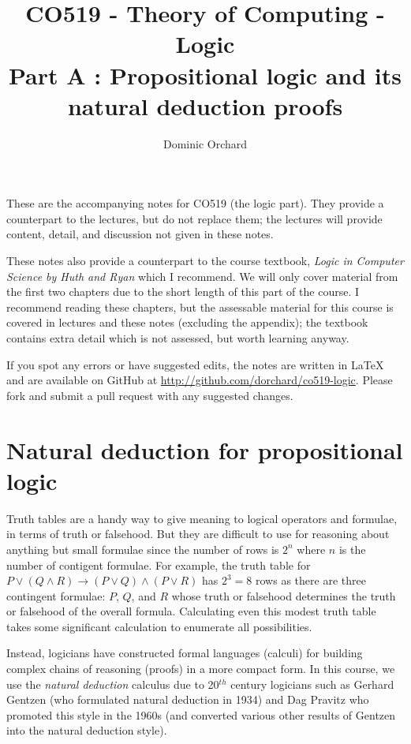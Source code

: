 \documentclass{article}
\title{\vspace{-3em}CO519 - Theory of Computing - Logic \\
  {\large{Part A : Propositional logic and its natural deduction
      proofs}}}
\author{Dominic Orchard}
\theoremstyle{definition}
\begin{document}
\maketitle

These are the accompanying notes for CO519 (the logic part). They provide
a counterpart to the lectures, but do not replace them; the lectures
will provide content, detail, and discussion not given in these notes.

These notes also provide a counterpart to the course textbook,
\emph{Logic in Computer Science by Huth and Ryan} which I 
recommend. We will only cover material from the first two chapters due
to the short length of this part of the course. I recommend reading
these chapters, but the assessable material for this course is
covered in lectures and these notes (excluding the appendix); the
textbook contains extra detail which is not assessed, but
worth learning anyway.

If you spot any errors or have suggested edits, the notes are written
in LaTeX and are available on GitHub at
\url{http://github.com/dorchard/co519-logic}. Please fork and submit a
pull request with any suggested changes.

\section{Natural deduction for propositional logic}

Truth tables are a handy way to give meaning to logical operators and
formulae, in terms of truth or falsehood. But they are difficult to
use for reasoning about anything but small formulae since the number
of rows is $2^n$ where $n$ is the number of contigent
formulae. For example, the truth table for
$P \vee (Q \wedge R) \rightarrow (P \vee Q) \wedge (P \vee R)$ has
$2^3 = 8$ rows as there are three contingent formulae: $P$, $Q$, and
$R$ whose truth or falsehood determines the truth or falsehood of the
overall formula. Calculating even this modest truth table takes some
significant calculation to enumerate all possibilities.

Instead, logicians have constructed formal languages (calculi) for
building complex chains of reasoning (proofs) in a more
compact form. In this course, we use the \emph{natural deduction} calculus
due to 20$^{th}$ century logicians such as Gerhard Gentzen
(who formulated natural deduction in 1934) and Dag Pravitz who 
promoted this style in the 1960s (and converted 
various other results of Gentzen into the natural deduction style).
\end{document}
